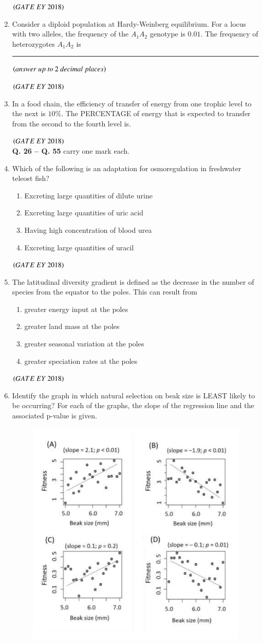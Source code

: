 \documentclass[journal]{IEEEtran}
\numberwithin{equation}{enumi}
\numberwithin{figure}{enumi}
\begin{document}
\begin{enumerate}
    \hfill{$\brak{ GATE\ EY\ 2018}$}
    \bigskip
\item Consider a diploid population at Hardy-Weinberg equilibrium. For a locus with two
alleles, the frequency of the $A_1A_2$ genotype is $0.01$. The frequency of heterozygotes $A_1A_2$ is\rule{3cm}{0.15mm}
$\brak{answer\ up\ to\ 2\ decimal\ places}$
   
    \hfill{$\brak{ GATE\ EY\ 2018}$}
    \bigskip
\item In a food chain, the efficiency of transfer of energy from one trophic level to the
next is $10\%$. The PERCENTAGE of energy that is expected to transfer from the
second to the fourth level is\underline{\hspace{3cm}}.

    \hfill{$\brak{ GATE\ EY\ 2018}$}
    \bigskip
\\
\noindent \textbf{Q. 26 -- Q. \textbf{55}} carry one mark each.
\\
\item Which of the following is an adaptation for osmoregulation in freshwater teleost
fish?
    \begin{enumerate}
        \item Excreting large quantities of dilute urine
        \item Excreting large quantities of uric acid
        \item Having high concentration of blood urea
        \item Excreting large quantities of uracil
    \end{enumerate}
    \hfill{$\brak{ GATE\ EY\ 2018}$}
    \bigskip
\item The latitudinal diversity gradient is defined as the decrease in the number of species
from the equator to the poles. This can result from
    \begin{enumerate}
        \item greater energy input at the poles
        \item greater land mass at the poles
        \item greater seasonal variation at the poles
        \item greater speciation rates at the poles 
    \end{enumerate}
    \hfill{$\brak{ GATE\ EY\ 2018}$}
    \bigskip
\item Identify the graph in which natural selection on beak size is LEAST likely to be
occurring? For each of the graphs, the slope of the regression line and the associated
p-value is given.\\
\begin{figure}[!ht]
\centering
\includegraphics[width=0.26\columnwidth]{figs/1.png}
\label{fig:1}
\end{figure}


\end{enumerate}
\end{document}
